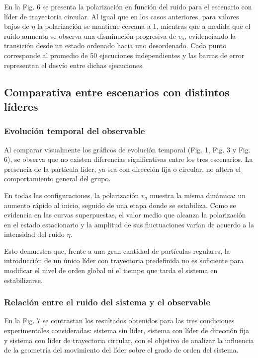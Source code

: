 \documentclass[a4paper,12pt]{article}
\begin{document}
En la Fig. 6 se presenta la polarización en función del ruido para el escenario con líder de trayectoria circular. Al igual que en los casos anteriores, para valores bajos de $\eta$ la polarización se mantiene cercana a 1, mientras que a medida que el ruido aumenta se observa una disminución progresiva de $v_a$, evidenciando la transición desde un estado ordenado hacia uno desordenado. Cada punto corresponde al promedio de 50 ejecuciones independientes y las barras de error representan el desvío entre dichas ejecuciones.

\FloatBarrier

\subsection{Comparativa entre escenarios con distintos líderes}

\subsubsection{Evolución temporal del observable}

Al comparar visualmente los gráficos de evolución temporal (Fig. 1, Fig. 3 y Fig. 6), se observa que no existen diferencias significativas entre los tres escenarios. La presencia de la partícula líder, ya sea con dirección fija o circular, no altera el comportamiento general del grupo.

En todas las configuraciones, la polarización $v_a$ muestra la misma dinámica: un aumento rápido al inicio, seguido de una etapa donde se estabiliza. Como se evidencia en las curvas superpuestas, el valor medio que alcanza la polarización en el estado estacionario y la amplitud de sus fluctuaciones varían de acuerdo a la intensidad del ruido $\eta$.

Esto demuestra que, frente a una gran cantidad de partículas regulares, la introducción de un único líder con trayectoria predefinida no es suficiente para modificar el nivel de orden global ni el tiempo que tarda el sistema en estabilizarse.

\subsubsection{Relación entre el ruido del sistema y el observable}

En la Fig. 7 se contrastan los resultados obtenidos para las tres condiciones experimentales consideradas: sistema sin líder, sistema con líder de dirección fija y sistema con líder de trayectoria circular, con el objetivo de analizar la influencia de la geometría del movimiento del líder sobre el grado de orden del sistema.
\end{document}
